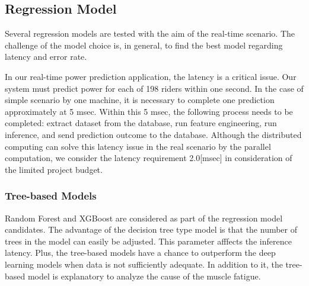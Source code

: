 \documentclass[runningheads]{llncs}
\begin{document}

\subsection{Regression Model} \label{sec:regression_model}
Several regression models are tested with the aim of the real-time scenario. The challenge of the model choice is, in general, to find the best model regarding latency and error rate.

In our real-time power prediction application, the latency is a critical issue. Our system must predict power for each of 198 riders within one second. In the case of simple scenario by one machine, it is necessary to complete one prediction approximately at 5 msec. Within this 5 msec, the following process needs to be completed: extract dataset from the database, run feature engineering, run inference, and send prediction outcome to the database. Although the distributed computing can solve this latency issue in the real scenario by the parallel computation, we consider the latency requirement 2.0[msec] in consideration of the limited project budget.

\subsubsection{Tree-based Models}
Random Forest\cite{ref_12} and XGBoost\cite{ref_13} are considered as part of the regression model candidates. The advantage of the decision tree type model is that the number of trees in the model can easily be adjusted. This parameter afffects the inference latency. Plus, the tree-based models have a chance to outperform the deep learning models when data is not sufficiently adequate. In addition to it, the tree-based model is explanatory to analyze the cause of the muscle fatigue.
\end{document}
